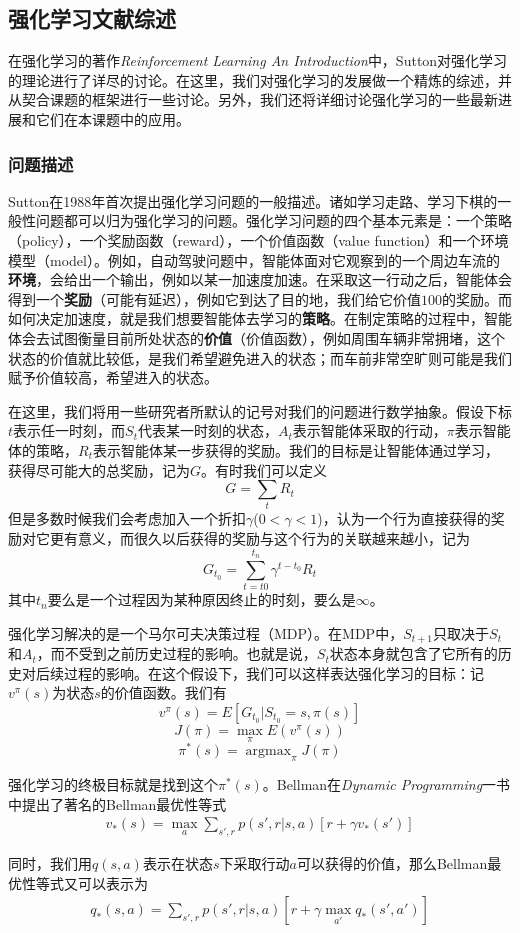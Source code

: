 \documentclass[degree=bachelor, tocarialchapter, pifootnote]{thuthesis}
\DeclareMathOperator*{\argmax}{argmax}
\begin{document}
  \subsection{强化学习文献综述}
    在强化学习的著作\textit{Reinforcement Learning An Introduction}\cite{Sutton_book}中，Sutton对强化学习的理论进行了详尽的讨论。在这里，我们对强化学习的发展做一个精炼的综述，并从契合课题的框架进行一些讨论。另外，我们还将详细讨论强化学习的一些最新进展和它们在本课题中的应用。
    \subsubsection{问题描述}
      Sutton在1988年首次提出强化学习问题的一般描述\cite{Sutton_problem_formulation}。诸如学习走路、学习下棋的一般性问题都可以归为强化学习的问题。强化学习问题的四个基本元素是：一个策略（policy），一个奖励函数（reward），一个价值函数（value function）和一个环境模型（model）。例如，自动驾驶问题中，智能体面对它观察到的一个周边车流的\textbf{环境}，会给出一个输出，例如以某一加速度加速。在采取这一行动之后，智能体会得到一个\textbf{奖励}（可能有延迟），例如它到达了目的地，我们给它价值$100$的奖励。而如何决定加速度，就是我们想要智能体去学习的\textbf{策略}。在制定策略的过程中，智能体会去试图衡量目前所处状态的\textbf{价值}（价值函数），例如周围车辆非常拥堵，这个状态的价值就比较低，是我们希望避免进入的状态；而车前非常空旷则可能是我们赋予价值较高，希望进入的状态。\par
      在这里，我们将用一些研究者所默认的记号对我们的问题进行数学抽象。假设下标$t$表示任一时刻，而$S_t$代表某一时刻的状态，$A_t$表示智能体采取的行动，$\pi$表示智能体的策略，$R_t$表示智能体某一步获得的奖励。我们的目标是让智能体通过学习，获得尽可能大的总奖励，记为$G$。有时我们可以定义
      $$ G = \sum_{t} R_t $$
      但是多数时候我们会考虑加入一个折扣$\gamma$($0 < \gamma < 1$)，认为一个行为直接获得的奖励对它更有意义，而很久以后获得的奖励与这个行为的关联越来越小，记为
      $$ G_{t_0} = \sum_{t = t0}^{t_n} \gamma^{t-t_0} R_t $$ 其中$t_n$要么是一个过程因为某种原因终止的时刻，要么是$\infty$。\par
      强化学习解决的是一个马尔可夫决策过程（MDP）\cite{Bellman_MDP}。在MDP中，$S_{t+1}$只取决于$S_t$和$A_t$，而不受到之前历史过程的影响。也就是说，$S_t$状态本身就包含了它所有的历史对后续过程的影响。在这个假设下，我们可以这样表达强化学习的目标\cite{DRL_for_driving}：记$v^{\pi}(s)$为状态$s$的价值函数。我们有$$ v^{\pi}(s) = E[G_{t_0} | S_{t_0} = s, \pi(s) ] $$
      $$ J(\pi) = \max_{\pi} E(v^{\pi}(s)) $$
      $$ \pi^*(s) = \argmax_{\pi} J(\pi) $$
    \par 强化学习的终极目标就是找到这个$\pi^*(s)$。Bellman在\textit{Dynamic Programming}一书中提出了著名的Bellman最优性等式\cite{Bellman_DP}
    \begin{align}
       v_*(s) = \max_{a} \sum_{s', r}p(s', r | s, a)[r + \gamma v_*(s')]
    \end{align}
    \par 同时，我们用$q(s, a)$表示在状态$s$下采取行动$a$可以获得的价值，那么Bellman最优性等式又可以表示为
    \begin{align}
       q_*(s, a) = \sum_{s', r}p(s', r | s, a)[r + \gamma \max_{a'} q_*(s', a')]
    \end{align}
\end{document}
